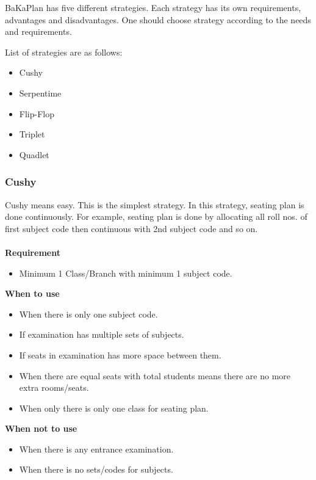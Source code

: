 BaKaPlan has five different strategies. Each strategy has its own
requirements, advantages and disadvantages. One should choose strategy
according to the needs and requirements.

List of strategies are as follows:

\begin{itemize}
\item Cushy
\item Serpentime
\item Flip-Flop
\item Triplet
\item Quadlet
\end{itemize}


\subsubsection{Cushy}
Cushy means easy. This is the simplest strategy. In this strategy,
seating plan is done continuously. For example, seating plan is done
by allocating all roll nos. of first subject code then continuous with
2nd subject code and so on.\\ \\
{\bf Requirement}
\begin{itemize}
\item Minimum 1 Class/Branch with minimum 1 subject code.
\end{itemize}
{\bf When to use}
\begin{itemize}
\item When there is only one subject code.
\item If examination has multiple sets of subjects.
\item If seats in examination has more space between them.
\item When there are equal seats with total students means there are no more
extra rooms/seats.
\item When only there is only one class for seating plan.
\end{itemize}
{\bf When not to use}
\begin{itemize}
\item When there is any entrance examination.
\item When there is no sets/codes for subjects.
\end{itemize}


